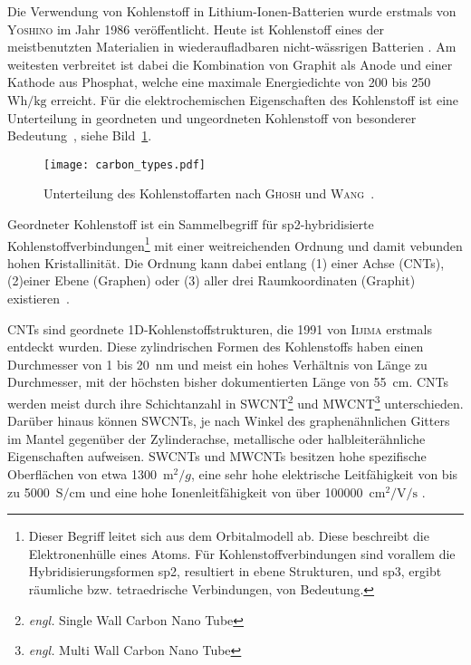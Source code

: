 Die Verwendung von Kohlenstoff in Lithium-Ionen-Batterien wurde erstmals von \textsc{Yoshino} \cite{Yoshino1986} im Jahr 1986 veröffentlicht.
Heute ist Kohlenstoff eines der meistbenutzten Materialien in wiederaufladbaren nicht-wässrigen Batterien \cite{Ahmad2021}. Am weitesten verbreitet ist dabei die Kombination von Graphit als Anode und einer Kathode aus Phosphat, welche eine maximale Energiedichte von 200 bis 250~$\si{\watt \hour \per \kg}$ erreicht. 
Für die elektrochemischen Eigenschaften des Kohlenstoff ist eine Unterteilung in geordneten und ungeordneten Kohlenstoff von besonderer Bedeutung~\cite{Ghosh2024}, siehe Bild~\ref{fig:carbon_types}.

\begin{figure}[!h]
        \center
		\texttt{[image: carbon\_types.pdf]}
		\caption{\label{fig:carbon_types}Unterteilung des Kohlenstoffarten nach \textsc{Ghosh} und \textsc{Wang}~\cite{Kundu2020,Wang2021,Liu2022b,Ghosh2024}.}
\end{figure}

Geordneter Kohlenstoff ist ein Sammelbegriff für sp2-hybridisierte Kohlenstoffverbindungen\footnote{Dieser Begriff leitet sich aus dem Orbitalmodell ab. Diese beschreibt die Elektronenhülle eines Atoms. Für Kohlenstoffverbindungen sind vorallem die Hybridisierungsformen sp2, resultiert in ebene Strukturen, und sp3, ergibt räumliche bzw. tetraedrische Verbindungen, von Bedeutung.} mit einer weitreichenden Ordnung und damit vebunden hohen Kristallinität. Die Ordnung kann dabei entlang (1) einer Achse (CNTs), (2)einer Ebene (Graphen) oder (3) aller drei Raumkoordinaten (Graphit) existieren~\cite{Wang2021}.

CNTs sind geordnete 1D-Kohlenstoffstrukturen, die 1991 von \textsc{Iijima} \cite{Iijima1991} erstmals entdeckt wurden. Diese zylindrischen Formen des Kohlenstoffs haben einen Durchmesser von 1 bis 20~$\si{\nano\metre}$ und meist ein hohes Verhältnis von Länge zu Durchmesser, mit der höchsten bisher dokumentierten Länge von 55~$\si{\centi\metre}$. CNTs werden meist durch ihre Schichtanzahl in SWCNT\footnote{\textit{engl.} Single Wall Carbon Nano Tube} und MWCNT\footnote{\textit{engl.} Multi Wall Carbon Nano Tube} unterschieden. Darüber hinaus können SWCNTs, je nach Winkel des graphenähnlichen Gitters im Mantel gegenüber der Zylinderachse, metallische oder halbleiterähnliche Eigenschaften aufweisen. 
SWCNTs und MWCNTs besitzen hohe spezifische Oberflächen von etwa 1300~$\si{\m^2\per g}$, eine sehr hohe elektrische Leitfähigkeit von bis zu 5000~$\si{\siemens \per \cm}$ und eine hohe Ionenleitfähigkeit von über 100000~$\si{\cm \squared \per \V \per \s}$ \cite{Xu2011,Uetani2014,Charlier2007}.

